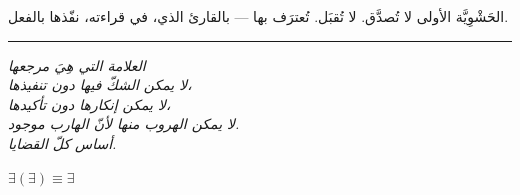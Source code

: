 \documentclass[10pt, openany, oneside]{book}
\begin{document}
الحَشْوِيَّة الأولى لا تُصدَّق. لا تُقبَل. تُعترَف بها --- بالقارئ الذي، في قراءته، نفّذها بالفعل.

\vspace{2em}

\begin{center}
    \rule{0.15\textwidth}{0.3pt}
\end{center}

\vspace{0.5em}

\begin{center}
    \itshape
    العلامة التي هِيَ مرجعها\\
    لا يمكن الشكّ فيها دون تنفيذها،\\
    لا يمكن إنكارها دون تأكيدها،\\
    لا يمكن الهروب منها لأنّ الهارب موجود.\\[0.8em]
    أساس كلّ القضايا.
\end{center}

\vspace{0.5em}

\begin{center}
    \textbf{$\exists(\exists) \equiv \exists$}
\end{center}

%
%
%
%
%
%
\end{document}
